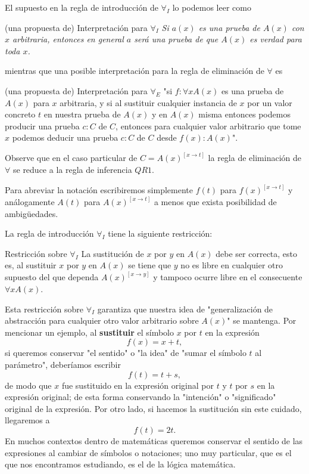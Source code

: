 \documentclass{article}
\begin{document}
El supuesto en la regla de introducción de $\forall_I$ lo podemos leer como 
\begin{sfwt}{(una propuesta de) Interpretación para $\forall_I$}
    \textit{Si $a(x)$ es una prueba de $A(x)$ con $x$ arbitraria, entonces en general $a$ será una prueba de que $A(x)$ es verdad para toda $x$.}    
\end{sfwt}
mientras que una posible interpretación para la regla de eliminación de $\forall$ es 

\begin{sfwt}{(una propuesta de) Interpretación para $\forall_E$}
    "si $f : \forall x A(x)$ es una prueba de $A(x)$ para $x$ arbitraria, y si al
    sustituir cualquier instancia de $x$ por un valor concreto $t$ en nuestra prueba
    de $A(x)$ y en $A(x)$ misma entonces podemos producir una prueba $c : C$ de $C$, entonces para cualquier valor arbitrario que tome $x$ podemos deducir una prueba 
    $c : C$ de $C$ desde $f(x) : A(x)$".
\end{sfwt}

Observe que en el caso particular de $C = A(x)^{[x \rightarrow t]}$ la regla de eliminación de $\forall$ se reduce a la regla de inferencia $QR1$.

\begin{prooftree}
\end{prooftree}

Para abreviar la notación escribiremos simplemente $f(t)$ para $f(x)^{[x \rightarrow t]}$ y análogamente $A(t)$ para
$A(x)^{[x \rightarrow t]}$ a menos que exista posibilidad de ambigüedades.

La regla de introducción $\forall_I$ tiene la siguiente restricción:
\begin{sfwt}{Restricción sobre $\forall_I$}
    La sustitución de $x$ por $y$ en $A(x)$ debe ser correcta, esto es, al sustituir $x$ por $y$ en $A(x)$ se tiene que $y$ no es libre en cualquier otro supuesto del que dependa $A(x)^{[x \rightarrow y]}$ y tampoco ocurre libre en el consecuente $\forall x A(x)$. \cite{SaraNegriJanVonPlato97} 
\end{sfwt}

Esta restricción sobre $\forall_I$ garantiza que nuestra idea de "generalización 
de abstracción para cualquier otro valor arbitrario sobre $A(x)$" se mantenga.
Por mencionar un ejemplo, al \textbf{sustituir} el símbolo $x$ por $t$ en la expresión
$$f(x) = x + t,$$ si queremos conservar "el sentido" o "la idea" de "sumar el símbolo 
$t$ al parámetro", deberíamos escribir $$f(t) = t + s,$$ de modo que $x$ fue sustituido 
en la expresión original por $t$ y $t$ por $s$ en la expresión original; de esta forma 
conservando la "intención" o "significado" original de la expresión. Por otro lado, si
hacemos la sustitución sin este cuidado, llegaremos a $$f(t) = 2t.$$ 
En muchos contextos dentro de matemáticas queremos conservar el sentido de las expresiones al cambiar
de símbolos o notaciones; uno muy particular, que es el que nos encontramos estudiando,
es el de la lógica matemática.
\end{document}
